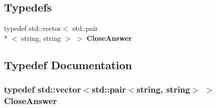 \subsection*{Typedefs}
\begin{DoxyCompactItemize}
\item 
typedef std\-::vector$<$ std\-::pair\\*
$<$ string, string $>$ $>$ {\bf Close\-Answer}
\end{DoxyCompactItemize}


\subsection{Typedef Documentation}
\subsubsection[{Close\-Answer}]{\setlength{\rightskip}{0pt plus 5cm}typedef std\-::vector$<$std\-::pair$<$string, string$>$ $>$ {\bf Close\-Answer}}\label{questioncard_8h_aa1cedac46506965b303979e4dbaa224b}
